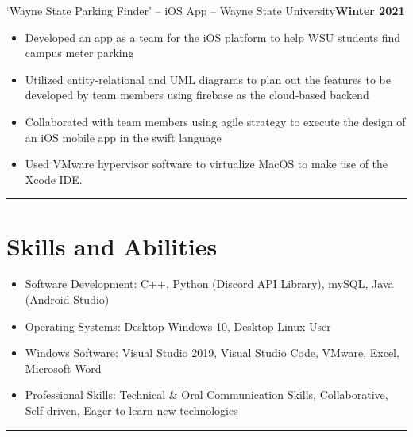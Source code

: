 \documentclass[10pt]{article}
\begin{document}
\noindent‘Wayne State Parking Finder’ – iOS App – Wayne State University\hfill \textbf{Winter 2021}
\begin{itemize}
	\item Developed an app as a team for the iOS platform to help WSU students find campus meter parking
	\item Utilized entity-relational and UML diagrams to plan out the features to be developed by team members using firebase as the cloud-based backend
	\item Collaborated with team members using agile strategy to execute the design of an iOS mobile app in the swift language
	\item Used VMware hypervisor software to virtualize MacOS to make use of the Xcode IDE.
\end{itemize}
\noindent\rule{\textwidth}{.5pt}

\section{Skills and Abilities}
\begin{itemize}
	\item Software Development: C++, Python (Discord API Library), mySQL, Java (Android Studio)
	\item Operating Systems: Desktop Windows 10, Desktop Linux User
	\item Windows Software: Visual Studio 2019, Visual Studio Code, VMware, Excel, Microsoft Word
	\item Professional Skills: Technical \& Oral Communication Skills, Collaborative, Self-driven, Eager to learn new technologies
\end{itemize}


\newpage
\noindent\rule{\textwidth}{.5pt}
\end{document}
